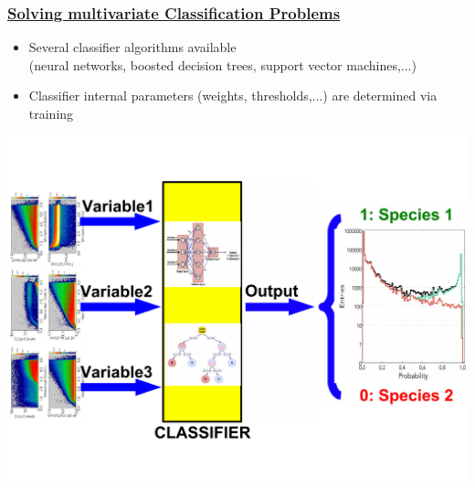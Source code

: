 \documentclass[xcolor=table, xcolor=dvipsnames]{beamer}
\begin{document}
\begin{frame}
  \frametitle{\hyperlink{con}{Solving multivariate Classification Problems}}
  \label{classi}
  \footnotesize
  
  \begin{itemize} 
    \item Several classifier algorithms available \\ (neural networks, boosted decision trees, support vector machines,...)
    \item Classifier internal parameters (weights, thresholds,...) are determined via training
  \end{itemize}
  
  \includegraphics[width=1.0\textwidth,height=0.57\textwidth]{classifier_scheme_new.pdf}
\end{frame}
\end{document}
